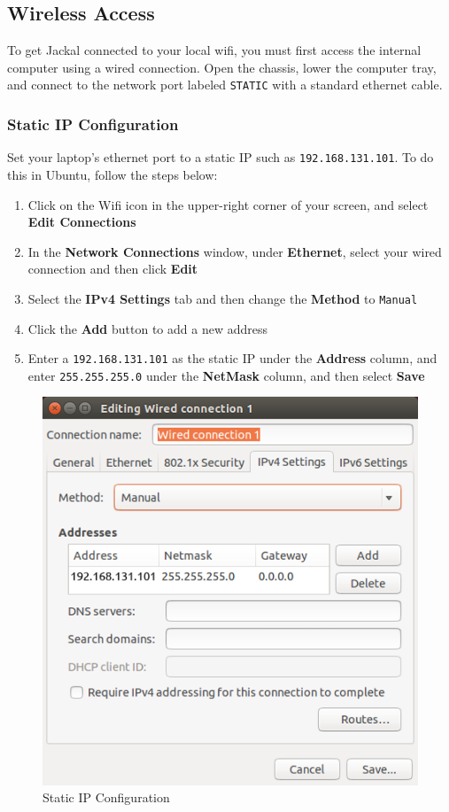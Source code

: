 \documentclass[]{clearpath-latex/clearpath-manual}
\begin{document}
\subsection{Wireless Access}

To get Jackal connected to your local wifi, you must first access the internal computer
using a wired connection. Open the chassis, lower the computer tray, and connect to the network port
labeled \lstinline{STATIC} with a standard ethernet cable.

\subsubsection{Static IP Configuration}

Set your laptop's ethernet port to a static IP such as \lstinline{192.168.131.101}.  To do this in Ubuntu, follow the steps below:
\begin{enumerate}
  \item Click on the Wifi icon in the upper-right corner of your screen, and select \textbf{Edit Connections}
  \item In the \textbf{Network Connections} window, under \textbf{Ethernet}, select your wired connection and then click \textbf{Edit}
  \item Select the \textbf{IPv4 Settings} tab and then change the \textbf{Method} to \lstinline{Manual}
  \item Click the \textbf{Add} button to add a new address
  \item Enter a \lstinline{192.168.131.101} as the static IP under the \textbf{Address} column, and enter \lstinline{255.255.255.0} under the \textbf{NetMask} column, and then select \textbf{Save}
\end{enumerate}

\begin{figure}[H]
  \centering
  \includegraphics[width=0.5\linewidth]{wired_connection.png}
  \caption{Static IP Configuration}
  \label{staticip}
\end{figure}
\end{document}
